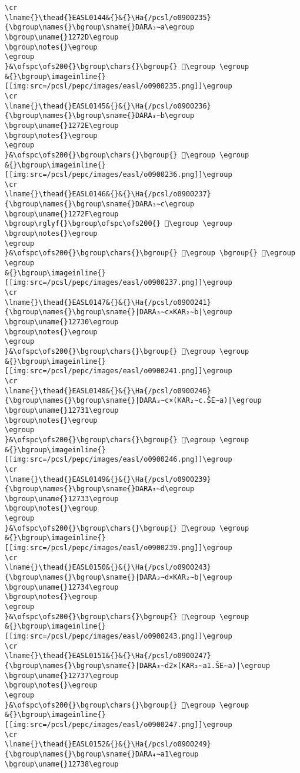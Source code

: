 \begin{verbatim}
\cr
\lname{}\thead{}EASL0144&{}&{}\Ha{/pcsl/o0900235}{\bgroup\names{}\bgroup\sname{}DARA₃∼a\egroup
\bgroup\uname{}1272D\egroup
\bgroup\notes{}\egroup
\egroup
}&\ofspc\ofs200{}\bgroup\chars{}\bgroup{} 𒜭\egroup \egroup
&{}\bgroup\imageinline{}[[img:src=/pcsl/pepc/images/easl/o0900235.png]]\egroup
\cr
\lname{}\thead{}EASL0145&{}&{}\Ha{/pcsl/o0900236}{\bgroup\names{}\bgroup\sname{}DARA₃∼b\egroup
\bgroup\uname{}1272E\egroup
\bgroup\notes{}\egroup
\egroup
}&\ofspc\ofs200{}\bgroup\chars{}\bgroup{} 𒜮\egroup \egroup
&{}\bgroup\imageinline{}[[img:src=/pcsl/pepc/images/easl/o0900236.png]]\egroup
\cr
\lname{}\thead{}EASL0146&{}&{}\Ha{/pcsl/o0900237}{\bgroup\names{}\bgroup\sname{}DARA₃∼c\egroup
\bgroup\uname{}1272F\egroup
\bgroup\rglyf{}\bgroup\ofspc\ofs200{} 𒜯\egroup \egroup
\bgroup\notes{}\egroup
\egroup
}&\ofspc\ofs200{}\bgroup\chars{}\bgroup{} 𒜯\egroup \bgroup{} 𒜲\egroup \egroup
&{}\bgroup\imageinline{}[[img:src=/pcsl/pepc/images/easl/o0900237.png]]\egroup
\cr
\lname{}\thead{}EASL0147&{}&{}\Ha{/pcsl/o0900241}{\bgroup\names{}\bgroup\sname{}|DARA₃∼c×KAR₂∼b|\egroup
\bgroup\uname{}12730\egroup
\bgroup\notes{}\egroup
\egroup
}&\ofspc\ofs200{}\bgroup\chars{}\bgroup{} 𒜰\egroup \egroup
&{}\bgroup\imageinline{}[[img:src=/pcsl/pepc/images/easl/o0900241.png]]\egroup
\cr
\lname{}\thead{}EASL0148&{}&{}\Ha{/pcsl/o0900246}{\bgroup\names{}\bgroup\sname{}|DARA₃∼c×(KAR₂∼c.ŠE∼a)|\egroup
\bgroup\uname{}12731\egroup
\bgroup\notes{}\egroup
\egroup
}&\ofspc\ofs200{}\bgroup\chars{}\bgroup{} 𒜱\egroup \egroup
&{}\bgroup\imageinline{}[[img:src=/pcsl/pepc/images/easl/o0900246.png]]\egroup
\cr
\lname{}\thead{}EASL0149&{}&{}\Ha{/pcsl/o0900239}{\bgroup\names{}\bgroup\sname{}DARA₃∼d\egroup
\bgroup\uname{}12733\egroup
\bgroup\notes{}\egroup
\egroup
}&\ofspc\ofs200{}\bgroup\chars{}\bgroup{} 𒜳\egroup \egroup
&{}\bgroup\imageinline{}[[img:src=/pcsl/pepc/images/easl/o0900239.png]]\egroup
\cr
\lname{}\thead{}EASL0150&{}&{}\Ha{/pcsl/o0900243}{\bgroup\names{}\bgroup\sname{}|DARA₃∼d×KAR₂∼b|\egroup
\bgroup\uname{}12734\egroup
\bgroup\notes{}\egroup
\egroup
}&\ofspc\ofs200{}\bgroup\chars{}\bgroup{} 𒜴\egroup \egroup
&{}\bgroup\imageinline{}[[img:src=/pcsl/pepc/images/easl/o0900243.png]]\egroup
\cr
\lname{}\thead{}EASL0151&{}&{}\Ha{/pcsl/o0900247}{\bgroup\names{}\bgroup\sname{}|DARA₃∼d2×(KAR₂∼a1.ŠE∼a)|\egroup
\bgroup\uname{}12737\egroup
\bgroup\notes{}\egroup
\egroup
}&\ofspc\ofs200{}\bgroup\chars{}\bgroup{} 𒜷\egroup \egroup
&{}\bgroup\imageinline{}[[img:src=/pcsl/pepc/images/easl/o0900247.png]]\egroup
\cr
\lname{}\thead{}EASL0152&{}&{}\Ha{/pcsl/o0900249}{\bgroup\names{}\bgroup\sname{}DARA₄∼a1\egroup
\bgroup\uname{}12738\egroup

\end{verbatim}

